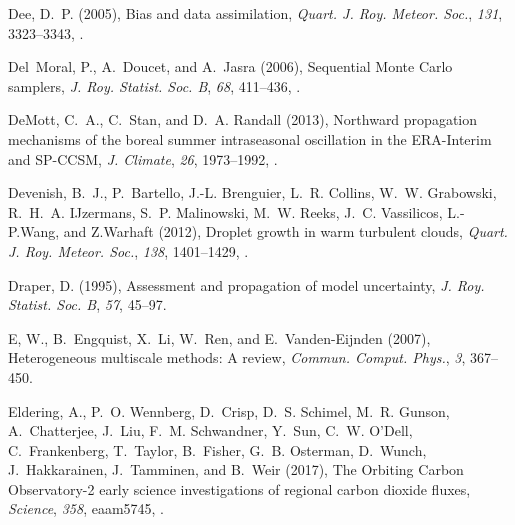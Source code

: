 \documentclass[draft]{agujournal}
\begin{document}
\begin{thebibliography}{196}
Dee, D.~P. (2005), Bias and data assimilation, \textit{Quart. J. Roy. Meteor.
  Soc.}, \textit{131}, 3323--3343, .

Del~Moral, P., A.~Doucet, and A.~Jasra (2006), Sequential {M}onte {C}arlo
  samplers, \textit{J. Roy. Statist. Soc. B}, \textit{68}, 411--436,
  .

DeMott, C.~A., C.~Stan, and D.~A. Randall (2013), Northward propagation
  mechanisms of the boreal summer intraseasonal oscillation in the
  {ERA}-{I}nterim and {SP-CCSM}, \textit{J. Climate}, \textit{26}, 1973--1992,
  .

Devenish, B.~J., P.~Bartello, J.-L. Brenguier, L.~R. Collins, W.~W. Grabowski,
  R.~H.~A. IJzermans, S.~P. Malinowski, M.~W. Reeks, J.~C. Vassilicos,
  L.-P.Wang, and Z.Warhaft (2012), Droplet growth in warm turbulent clouds,
  \textit{Quart. J. Roy. Meteor. Soc.}, \textit{138}, 1401--1429,
  .

Draper, D. (1995), Assessment and propagation of model uncertainty, \textit{J.
  Roy. Statist. Soc. B}, \textit{57}, 45--97.

E, W., B.~Engquist, X.~Li, W.~Ren, and E.~Vanden-Eijnden (2007), Heterogeneous
  multiscale methods: {A} review, \textit{Commun. Comput. Phys.}, \textit{3},
  367--450.

Eldering, A., P.~O. Wennberg, D.~Crisp, D.~S. Schimel, M.~R. Gunson,
  A.~Chatterjee, J.~Liu, F.~M. Schwandner, Y.~Sun, C.~W. O'Dell,
  C.~Frankenberg, T.~Taylor, B.~Fisher, G.~B. Osterman, D.~Wunch,
  J.~Hakkarainen, J.~Tamminen, and B.~Weir (2017), The {O}rbiting {C}arbon
  {O}bservatory-2 early science investigations of regional carbon dioxide
  fluxes, \textit{Science}, \textit{358}, eaam5745,
  .


\end{thebibliography}
\end{document}
